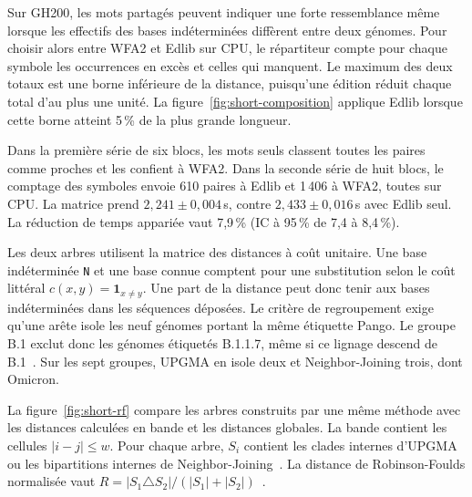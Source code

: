 Sur GH200, les mots partagés peuvent indiquer une forte ressemblance même lorsque les effectifs des bases indéterminées diffèrent entre deux génomes. Pour choisir alors entre WFA2 et Edlib sur CPU, le répartiteur compte pour chaque symbole les occurrences en excès et celles qui manquent. Le maximum des deux totaux est une borne inférieure de la distance, puisqu’une édition réduit chaque total d’au plus une unité. La figure~\ref{fig:short-composition} applique Edlib lorsque cette borne atteint 5\,\% de la plus grande longueur.

Dans la première série de six blocs, les mots seuls classent toutes les paires comme proches et les confient à WFA2. Dans la seconde série de huit blocs, le comptage des symboles envoie 610 paires à Edlib et 1\,406 à WFA2, toutes sur CPU. La matrice prend \(2{,}241\pm0{,}004\)\,s, contre \(2{,}433\pm0{,}016\)\,s avec Edlib seul. La réduction de temps appariée vaut 7,9\,\% (IC à 95\,\% de 7,4 à 8,4\,\%).

Les deux arbres utilisent la matrice des distances à coût unitaire. Une base indéterminée \texttt{N} et une base connue comptent pour une substitution selon le coût littéral \(c(x,y)=\mathbf{1}_{x\ne y}\). Une part de la distance peut donc tenir aux bases indéterminées dans les séquences déposées. Le critère de regroupement exige qu’une arête isole les neuf génomes portant la même étiquette Pango. Le groupe B.1 exclut donc les génomes étiquetés B.1.1.7, même si ce lignage descend de B.1~\cite{pango}. Sur les sept groupes, UPGMA en isole deux et Neighbor-Joining trois, dont Omicron.

La figure~\ref{fig:short-rf} compare les arbres construits par une même méthode avec les distances calculées en bande et les distances globales. La bande contient les cellules \(|i-j|\le w\). Pour chaque arbre, \(S_i\) contient les clades internes d’UPGMA~\cite{upgma} ou les bipartitions internes de Neighbor-Joining~\cite{nj}. La distance de Robinson-Foulds normalisée vaut \mbox{\(R=|S_1\triangle S_2|/(|S_1|+|S_2|)\)}~\cite{robinson}.

